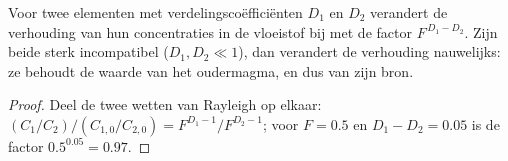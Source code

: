 \begin{corollary}\label{cor:b2:magmatic-differentiation:ratio}
Voor twee elementen met verdelingscoëfficiënten $D_1$ en $D_2$ verandert de verhouding van hun
concentraties in de vloeistof bij  met de factor $F^{\,D_1-D_2}$.
Zijn beide sterk incompatibel ($D_1, D_2 \ll 1$), dan verandert de verhouding
nauwelijks: ze behoudt de waarde van het oudermagma, en dus van zijn bron.
\end{corollary}

\begin{proof}
Deel de twee wetten van Rayleigh op elkaar: $(C_1/C_2)/(C_{1,0}/C_{2,0}) = F^{D_1-1}/F^{D_2-1}$;
voor $F = 0.5$ en $D_1 - D_2 = 0.05$ is de factor $0.5^{0.05} = 0.97$.
\end{proof}

